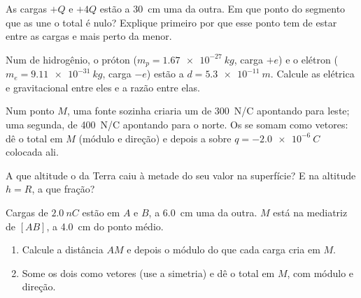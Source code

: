 \begin{exercise}[$\star\star$]\label{exo:g11:electric-gravitational-fields:9}
As cargas $+Q$ e $+4Q$ estão a \qty{30}{cm} uma da outra. Em que ponto do
segmento que as une o  total é nulo? Explique primeiro por que esse
ponto tem de estar entre as cargas e mais perto da menor.
\end{exercise}

\begin{exercise}[$\star\star$]\label{exo:g11:electric-gravitational-fields:10}
Num  de hidrogênio, o próton ($m_p = \qty{1.67e-27}{kg}$, carga
$+e$) e o elétron ($m_e = \qty{9.11e-31}{kg}$, carga $-e$) estão a
$d = \qty{5.3e-11}{m}$. Calcule as  elétrica e gravitacional entre
eles e a razão entre elas.
\end{exercise}

\begin{exercise}[$\star\star$]\label{exo:g11:electric-gravitational-fields:11}
Num ponto $M$, uma fonte sozinha criaria um  de \qty{300}{N/C}
apontando para leste; uma segunda, de \qty{400}{N/C} apontando para o
norte. Os  se somam como vetores: dê o  total em $M$ (módulo e
direção) e depois a  sobre $q = \qty{-2.0e-6}{C}$ colocada ali.
\end{exercise}

\begin{exercise}[$\star\star\star$]\label{exo:g11:electric-gravitational-fields:12}
A que altitude o  da Terra caiu à metade do seu valor na superfície?
E na altitude $h = R$, a que fração?
\end{exercise}

\begin{exercise}[$\star\star\star$]\label{exo:g11:electric-gravitational-fields:13}
Cargas de $\qty{+2.0}{nC}$ estão em $A$ e $B$, a \qty{6.0}{cm} uma da
outra. $M$ está na mediatriz de $[AB]$, a \qty{4.0}{cm} do ponto médio.
\begin{enumerate}
  \item Calcule a distância $AM$ e depois o módulo do  que cada
        carga cria em $M$.
  \item Some os dois  como vetores (use a simetria) e dê o 
        total em $M$, com módulo e direção.
\end{enumerate}
\end{exercise}

